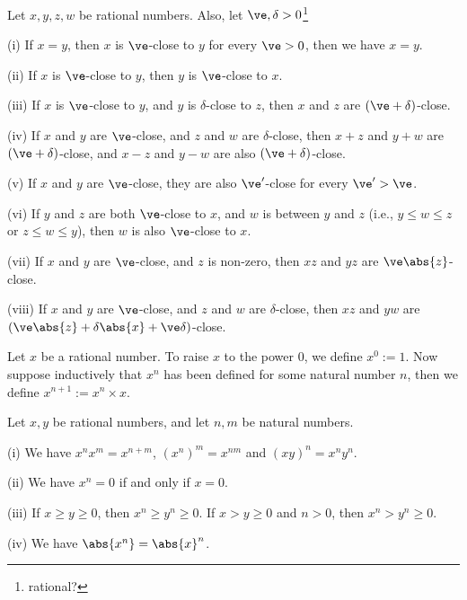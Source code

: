 \begin{proposition}
Let $x,y,z,w$ be rational numbers. Also, let $\ve,\delta >0$\footnote{rational?}
\ben
\item [(i)] If $x=y$, then $x$ is $\ve$-close to $y$ for every $\ve>0$, then we have $x=y$.
\item [(ii)] If $x$ is $\ve$-close to $y$, then $y$ is $\ve$-close to $x$.
\item [(iii)] If $x$ is $\ve$-close to $y$, and $y$ is $\delta$-close to $z$, then $x$ and $z$ are $(\ve + \delta)$-close.
\item [(iv)] If $x$ and $y$ are $\ve$-close, and $z$ and $w$ are $\delta$-close, then $x+z$ and $y+w$ are $(\ve+\delta)$-close, and $x-z$ and $y-w$ are also $(\ve+\delta)$-close.
\item [(v)] If $x$ and $y$ are $\ve$-close, they are also $\ve'$-close for every $\ve'>\ve$.
\item [(vi)] If $y$ and $z$ are both $\ve$-close to $x$, and $w$ is between $y$ and $z$ (i.e., $y\leq w\leq z$ or $z\leq w\leq y$), then $w$ is also $\ve$-close to $x$.
\item [(vii)] If $x$ and $y$ are $\ve$-close, and $z$ is non-zero, then $xz$ and $yz$ are $\ve\abs{z}$-close.
\item [(viii)] If $x$ and $y$ are $\ve$-close, and $z$ and $w$ are $\delta$-close, then $xz$ and $yw$ are $(\ve \abs{z} + \delta \abs{x} + \ve\delta)$-close.
\een
\end{proposition}

\begin{definition}\label{def:exponentiation_natural_number}
Let $x$ be a rational number. To raise $x$ to the power 0, we define $x^0 := 1$. Now suppose inductively that $x^n$ has been defined for some natural number $n$, then we define $x^{n+1} := x^n \times x$.
\end{definition}

\begin{proposition}
Let $x,y$ be rational numbers, and let $n,m$ be natural numbers.
\ben
\item [(i)] We have $x^nx^m = x^{n+m}$, $(x^n)^m = x^{nm}$ and $(xy)^n = x^ny^n$.
\item [(ii)] We have $x^n = 0$ if and only if $x=0$.
\item [(iii)] If $x\geq y \geq 0$, then $x^n \geq y^n \geq 0$. If $x> y \geq 0$ and $n>0$, then $x^n > y^n \geq 0$.
\item [(iv)] We have $\abs{x^n} = \abs{x}^n$.
\een
\end{proposition}

